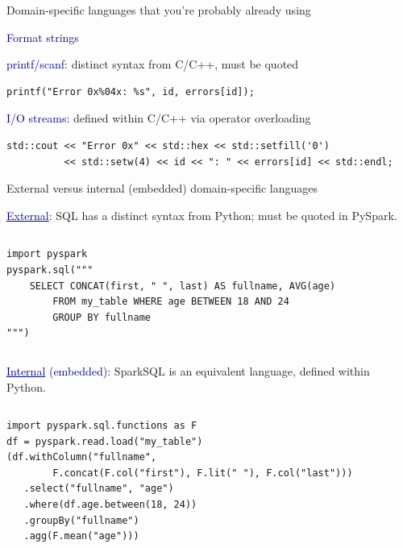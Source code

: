 \documentclass[aspectratio=169]{beamer}
\begin{document}
\begin{frame}[fragile]{Domain-specific languages that you're probably already using}
\LARGE
\vspace{0.25 cm}

\textcolor{darkblue}{Format strings}

\vspace{0.5 cm}
{\large \textcolor{darkblue}{printf/scanf:} distinct syntax from C/C++, must be quoted}

\small
\begin{verbatim}
printf("Error 0x%04x: %s", id, errors[id]);
\end{verbatim}

\vspace{0.5 cm}
{\large \textcolor{darkblue}{I/O streams:} defined within C/C++ via operator overloading}

\small
\begin{verbatim}
std::cout << "Error 0x" << std::hex << std::setfill('0')
          << std::setw(4) << id << ": " << errors[id] << std::endl;
\end{verbatim}

\large
\vspace{0.05 cm}
\begin{center}
\end{center}
\end{frame}

\begin{frame}[fragile]{External versus internal (embedded) domain-specific languages}
\vspace{0.3 cm}

{\large \textcolor{darkblue}{\underline{External}:} SQL has a distinct syntax from Python; must be quoted in PySpark.}

\small
\vspace{-0.25 cm}
\begin{columns}
\begin{verbatim}
import pyspark
pyspark.sql("""
    SELECT CONCAT(first, " ", last) AS fullname, AVG(age)
        FROM my_table WHERE age BETWEEN 18 AND 24
        GROUP BY fullname
""")
\end{verbatim}
\end{columns}

\vspace{0.5 cm}
{\large \textcolor{darkblue}{\underline{Internal} (embedded):} SparkSQL is an equivalent language, defined within Python.}

\small
\vspace{-0.25 cm}
\begin{columns}
\begin{verbatim}
import pyspark.sql.functions as F
df = pyspark.read.load("my_table")
(df.withColumn("fullname",
        F.concat(F.col("first"), F.lit(" "), F.col("last")))
   .select("fullname", "age")
   .where(df.age.between(18, 24))
   .groupBy("fullname")
   .agg(F.mean("age")))
\end{verbatim}
\end{columns}
\end{frame}
\end{document}
